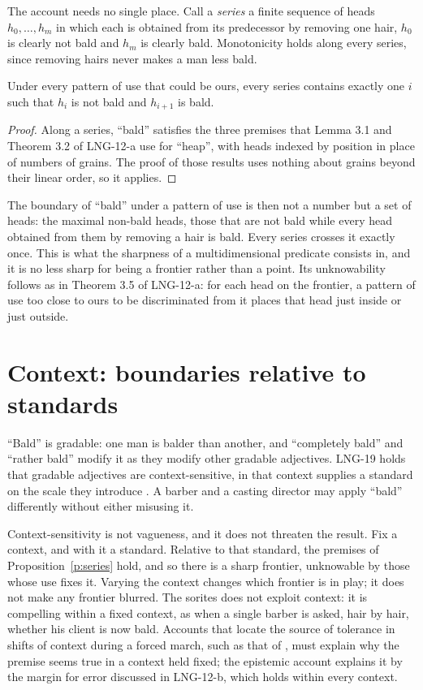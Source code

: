 \documentclass{situationist-preprint}
\begin{document}
The account needs no single place. Call a \emph{series} a finite sequence of heads $h_0, \dots, h_m$ in which each is obtained from its predecessor by removing one hair, $h_0$ is clearly not bald and $h_m$ is clearly bald. Monotonicity holds along every series, since removing hairs never makes a man less bald.

\begin{proposition}\label{p:series}
Under every pattern of use that could be ours, every series contains exactly one $i$ such that $h_i$ is not bald and $h_{i+1}$ is bald.
\end{proposition}

\begin{proof}
Along a series, \enquote{bald} satisfies the three premises that Lemma 3.1 and Theorem 3.2 of LNG-12-a use for \enquote{heap}, with heads indexed by position in place of numbers of grains. The proof of those results uses nothing about grains beyond their linear order, so it applies.
\end{proof}

The boundary of \enquote{bald} under a pattern of use is then not a number but a set of heads: the maximal non-bald heads, those that are not bald while every head obtained from them by removing a hair is bald. Every series crosses it exactly once. This is what the sharpness of a multidimensional predicate consists in, and it is no less sharp for being a frontier rather than a point. Its unknowability follows as in Theorem 3.5 of LNG-12-a: for each head on the frontier, a pattern of use too close to ours to be discriminated from it places that head just inside or just outside.

\section{Context: boundaries relative to standards}

\enquote{Bald} is gradable: one man is balder than another, and \enquote{completely bald} and \enquote{rather bald} modify it as they modify other gradable adjectives. LNG-19 holds that gradable adjectives are context-sensitive, in that context supplies a standard on the scale they introduce \citep{Kennedy2007}. A barber and a casting director may apply \enquote{bald} differently without either misusing it.

Context-sensitivity is not vagueness, and it does not threaten the result. Fix a context, and with it a standard. Relative to that standard, the premises of Proposition~\ref{p:series} hold, and so there is a sharp frontier, unknowable by those whose use fixes it. Varying the context changes which frontier is in play; it does not make any frontier blurred. The sorites does not exploit context: it is compelling within a fixed context, as when a single barber is asked, hair by hair, whether his client is now bald. Accounts that locate the source of tolerance in shifts of context during a forced march, such as that of \citet{Raffman1994}, must explain why the premise seems true in a context held fixed; the epistemic account explains it by the margin for error discussed in LNG-12-b, which holds within every context.
\end{document}
